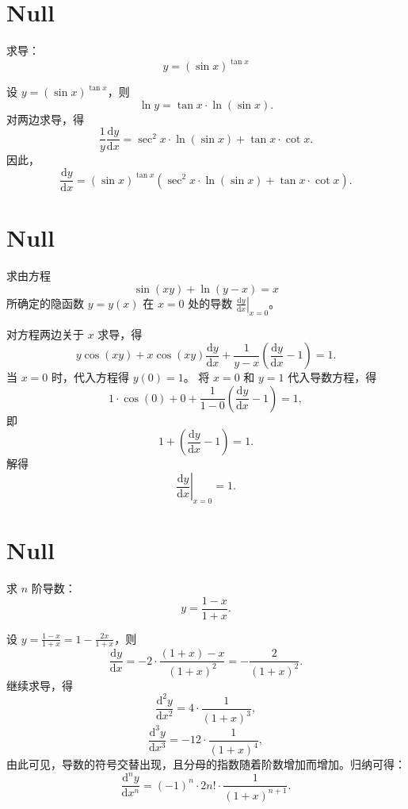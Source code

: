 \documentclass[11pt]{../../TexTemplate/elegantbook} %
\begin{document}
\section{Null}
求导：
\[
y= (\sin x)^{\tan x}
\]

\begin{solution}
    设 \( y = (\sin x)^{\tan x} \)，则
    \[
    \ln y = \tan x \cdot \ln(\sin x).
    \]
    对两边求导，得
    \[
    \frac{1}{y} \frac{\mathrm{d}y}{\mathrm{d}x} = \sec^{2} x \cdot \ln(\sin x) + \tan x \cdot \cot x.
    \]
    因此，
    \[
    \frac{\mathrm{d}y}{\mathrm{d}x} = (\sin x)^{\tan x} \left( \sec^{2} x \cdot \ln(\sin x) + \tan x \cdot \cot x \right).
    \]
\end{solution}

\section{Null}
求由方程
\[
\sin(xy) + \ln(y-x) = x
\]
所确定的隐函数 \( y = y(x) \) 在 \( x=0 \) 处的导数 \( \left.\frac{\mathrm{d}y}{\mathrm{d}x} \right|_{x=0} \)。
\begin{solution}
    对方程两边关于 \( x \) 求导，得
    \[
    y \cos(xy) + x \cos(xy) \frac{\mathrm{d}y}{\mathrm{d}x} + \frac{1}{y-x} \left( \frac{\mathrm{d}y}{\mathrm{d}x} - 1 \right) = 1.
    \]
    当 \( x=0 \) 时，代入方程得 \( y(0) = 1 \)。
    \newline 将 \( x=0 \) 和 \( y=1 \) 代入导数方程，得
    \[
    1 \cdot \cos(0) + 0 + \frac{1}{1-0} \left( \frac{\mathrm{d}y}{\mathrm{d}x} - 1 \right) = 1,
    \]
    即
    \[
    1 + \left( \frac{\mathrm{d}y}{\mathrm{d}x} - 1 \right) = 1.
    \]
    解得
    \[
    \left. \frac{\mathrm{d}y}{\mathrm{d}x} \right|_{x=0} = 1.
    \]
\end{solution}

\section{Null}
求 \(n\) 阶导数：
\[
y = \frac{1-x}{1+x}.
\]
\begin{solution}
    设 \( y = \frac{1-x}{1+x} = 1 - \frac{2x}{1+x} \)，则
    \[
    \frac{\mathrm{d}y}{\mathrm{d}x} = -2 \cdot \frac{(1+x) - x}{(1+x)^{2}} = -\frac{2}{(1+x)^{2}}.
    \]
    继续求导，得
    \[
    \frac{\mathrm{d}^{2}y}{\mathrm{d}x^{2}} = 4 \cdot \frac{1}{(1+x)^{3}},
    \]
    \[
    \frac{\mathrm{d}^{3}y}{\mathrm{d}x^{3}} = -12 \cdot \frac{1}{(1+x)^{4}},
    \]
    由此可见，导数的符号交替出现，且分母的指数随着阶数增加而增加。归纳可得：
    \[
    \frac{\mathrm{d}^{n}y}{\mathrm{d}x^{n}} = (-1)^{n} \cdot 2n! \cdot \frac{1}{(1+x)^{n+1}}.
    \]
\end{solution}
\end{document}
